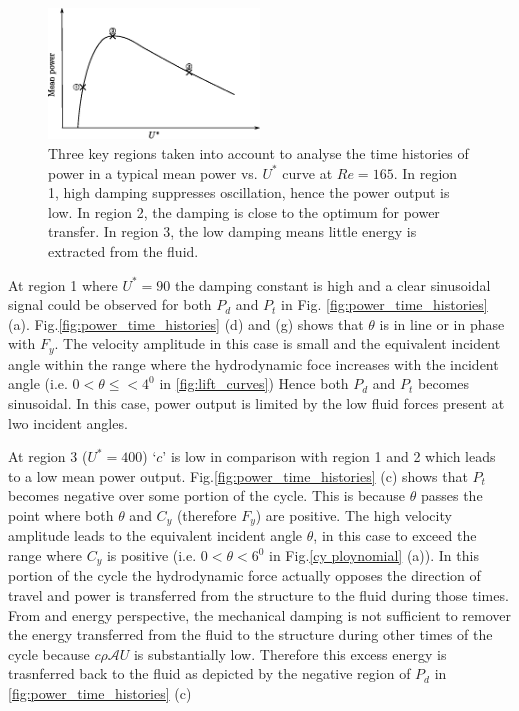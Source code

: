 \begin{figure}[h!]
\centering
\includegraphics[width=0.5\textwidth]{../FnP/sketch_1}
\caption{ Three key regions taken into account to analyse the time histories of power in a typical mean power vs. $U^*$ curve at $Re=165$. In region 1, high damping suppresses oscillation, hence the power output is low. In region 2, the damping is close to the optimum for power transfer. In region 3, the low damping means little energy is extracted from the fluid.}
\label{fig:regions_1}
\end{figure}

 
 
 
 At region 1 where $U^*=90$ the damping constant is high and a clear sinusoidal signal could be observed for both $P_d$ and $P_t$ in Fig. \ref{fig:power_time_histories} (a). Fig.\ref{fig:power_time_histories} (d) and (g) shows that $\theta$ is in line or in phase with $F_y$.  The velocity amplitude in this case is small and the equivalent incident angle within the range where the hydrodynamic foce increases with the incident angle (i.e. $0<\theta \leq < 4^0$ in \ref{fig:lift_curves}) Hence both $P_d$ and $P_t$ becomes sinusoidal. In this case, power output is limited by the low fluid forces present at lwo incident angles.  
 
 
  At region 3 ($U^*= 400$) `$c$' is low in comparison with region 1 and 2 which leads to a low mean power output. Fig.\ref{fig:power_time_histories} (c) shows that $P_t$ becomes negative over some portion of the cycle. This is because $\theta$  passes the point where both $\theta$ and $C_y$ (therefore $F_y$) are positive. The high velocity amplitude leads to the equivalent incident angle $\theta$, in this case to exceed the range where $C_y$ is positive (i.e. $0<\theta<6^0$ in Fig.\ref{cy ploynomial} (a)). In this portion of the cycle the hydrodynamic force actually opposes the direction of travel and power is transferred from the structure to the fluid during those times. From and energy perspective, the mechanical damping is not sufficient to remover the energy transferred from the fluid to the structure during other times of the cycle because $c\rho\mathcal{A}U$ is substantially low. Therefore this excess energy is trasnferred back to the fluid as depicted by the negative region of $P_d$ in \ref{fig:power_time_histories} (c) 
 

